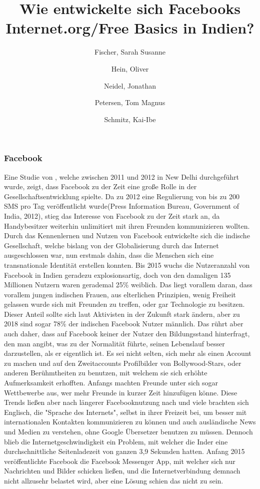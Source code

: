 \documentclass{article}
\title{Wie entwickelte sich Facebooks Internet.org/Free Basics in Indien?}
\author{
  Fischer, Sarah Susanne\\
  \and
  Hein, Oliver\\
  \and
  Neidel, Jonathan\\
  \and
  Petersen, Tom Magnus\\
  \and
  Schmitz, Kai-Ibe\\
}
\begin{document}
\maketitle
\subsubsection {Facebook}
Eine Studie von \textcite{empowermentThroughFacebook}, welche zwischen 2011 und 2012 in New Delhi durchgeführt wurde, zeigt, dass Facebook zu der Zeit eine große Rolle in der Gesellschaftsentwicklung spielte. 
\medskip
Da zu 2012 eine Regulierung von bis zu 200 SMS pro Tag veröffentlicht wurde(Press Information Bureau,
Government of India, 2012), stieg das Interesse von Facebook zu der Zeit stark an,
da Handybesitzer weiterhin unlimitiert mit ihren Freunden kommunizieren wollten.
Durch das Kennenlernen und Nutzen von Facebook entwickelte sich die indische Gesellschaft, welche bislang von der Globalisierung durch das Internet ausgeschlossen war, nun erstmals dahin, dass die Menschen sich eine transnationale Identität erstellen konnten.
\medskip
Bis 2015 wuchs die Nutzeranzahl von Facebook in Indien geradezu explosionsartig, doch von den damaligen 135 Millionen Nutzern waren gerademal 25\% weiblich\autocite{slideshareIndia}. Das liegt vorallem daran, dass vorallem jungen indischen Frauen, aus elterlichen Prinzipien, 
wenig Freiheit gelassen wurde sich mit Freunden zu treffen, oder gar Technologie
zu besitzen. Dieser Anteil sollte sich laut Aktivisten in der Zukunft stark ändern, 
aber zu 2018 sind sogar 78\% der indischen Facebook Nutzer männlich. 
\medskip
Das rührt aber auch daher, dass auf Facebook keiner der Nutzer den Bildungsstand hinterfragt, den man angibt, was zu der Normalität führte, seinen Lebenslauf besser darzustellen, als er eigentlich ist. Es sei nicht selten, sich mehr als einen Account zu machen und auf den Zweitaccounts Profilbilder von Bollywood-Stars, oder anderen Berühmtheiten zu benutzen,
mit welchem sie sich erhöhte Aufmerksamkeit erhofften. 
Anfangs machten Freunde unter sich sogar Wettbewerbe aus, wer mehr Freunde in kurzer Zeit hinzufügen könne.
Diese Trends ließen aber nach längerer Facebooknutzung nach und viele brachten sich Englisch, die "Sprache des Internets", 
selbst in ihrer Freizeit bei, um besser mit internationalen Kontakten
kommunizieren zu können und auch ausländische News und Medien zu verstehen, ohne Google Übersetzer benutzen zu müssen.
\medskip
Dennoch blieb die Internetgeschwindigkeit ein Problem, mit welcher die Inder eine durchschnittliche Seitenladezeit von ganzen 3,9 Sekunden hatten\autocite{mashable}. Anfang 2015 veröffentlichte Facebook die Facebook Messenger App, mit welcher sich nur Nachrichten und Bilder schicken ließen, und die Internetverbindung demnach nicht allzusehr belastet wird, aber eine Lösung schien das nicht zu sein.
\medskip



\end{document}
